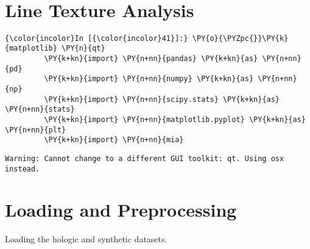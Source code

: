     \begin{center}
    \end{center}
    { \hspace*{\fill} \\}


\section*{Line Texture Analysis}


    \begin{Verbatim}[commandchars=\\\{\}]
{\color{incolor}In [{\color{incolor}41}]:} \PY{o}{\PYZpc{}}\PY{k}{matplotlib} \PY{n}{qt}
         \PY{k+kn}{import} \PY{n+nn}{pandas} \PY{k+kn}{as} \PY{n+nn}{pd}
         \PY{k+kn}{import} \PY{n+nn}{numpy} \PY{k+kn}{as} \PY{n+nn}{np}
         \PY{k+kn}{import} \PY{n+nn}{scipy.stats} \PY{k+kn}{as} \PY{n+nn}{stats}
         \PY{k+kn}{import} \PY{n+nn}{matplotlib.pyplot} \PY{k+kn}{as} \PY{n+nn}{plt}
         \PY{k+kn}{import} \PY{n+nn}{mia}
\end{Verbatim}

    \begin{Verbatim}[commandchars=\\\{\}]
Warning: Cannot change to a different GUI toolkit: qt. Using osx instead.
    \end{Verbatim}

    \section{Loading and Preprocessing}\label{loading-and-preprocessing}

    Loading the hologic and synthetic datasets.

